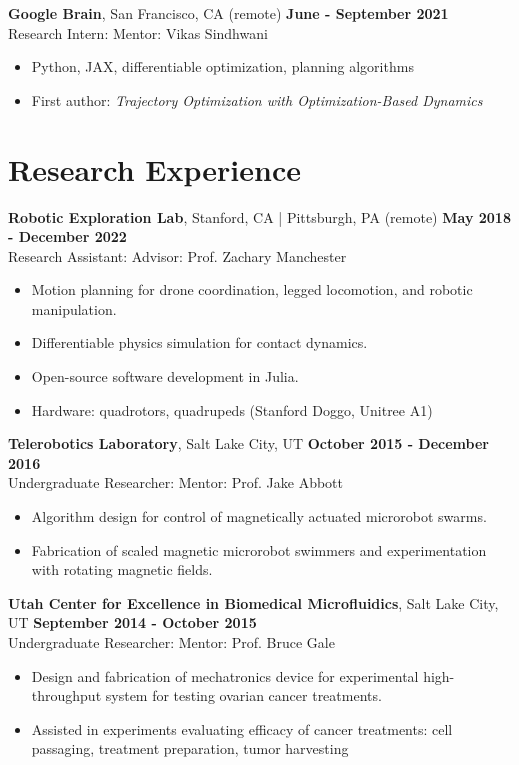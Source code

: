 \documentclass[10pt]{article}
\begin{document}
\noindent\textbf{Google Brain}, San Francisco, CA (remote) \hfill \textbf{June - September 2021} \\
Research Intern: \hfill Mentor: {\color{lightgray} Vikas Sindhwani}
\begin{itemize}
    \item {\color{lightgray} Python, JAX, differentiable optimization, planning algorithms}
    \item {\color{lightgray} First author: 
    \textit{Trajectory Optimization with Optimization-Based Dynamics}}
\end{itemize}

\section*{Research Experience}
\textbf{Robotic Exploration Lab}, Stanford, CA | Pittsburgh, PA (remote) \hfill \textbf{May 2018 - December 2022} \\
Research Assistant: \hfill Advisor: {\color{lightgray} Prof. Zachary Manchester}
\begin{itemize}
    \item {\color{lightgray} Motion planning for drone coordination, legged locomotion, and robotic manipulation.}
    \item {\color{lightgray} Differentiable physics simulation for contact dynamics.}
    \item {\color{lightgray} Open-source software development in Julia.}
    \item{\color{lightgray} Hardware: quadrotors, quadrupeds (Stanford Doggo, Unitree A1)}
\end{itemize}

\noindent\textbf{Telerobotics Laboratory}, Salt Lake City, UT \hfill \textbf{October 2015 - December 2016} \\
Undergraduate Researcher: \hfill Mentor: {\color{lightgray} Prof. Jake Abbott}
\begin{itemize}
    \item {\color{lightgray} Algorithm design for control of magnetically actuated microrobot swarms.}
    \item {\color{lightgray} Fabrication of scaled magnetic microrobot swimmers and experimentation with rotating magnetic fields.}
\end{itemize}

\noindent\textbf{Utah Center for Excellence in Biomedical Microfluidics}, Salt Lake City, UT \hfill \textbf{September 2014 - October 2015} \\
Undergraduate Researcher: \hfill Mentor: {\color{lightgray} Prof. Bruce Gale}
\begin{itemize}
    \item {\color{lightgray} Design and fabrication of mechatronics device for experimental high-throughput system for testing ovarian cancer treatments.}
    \item {\color{lightgray} Assisted in experiments evaluating efficacy of cancer treatments: cell passaging, treatment preparation, tumor harvesting}
\end{itemize}
\end{document}
